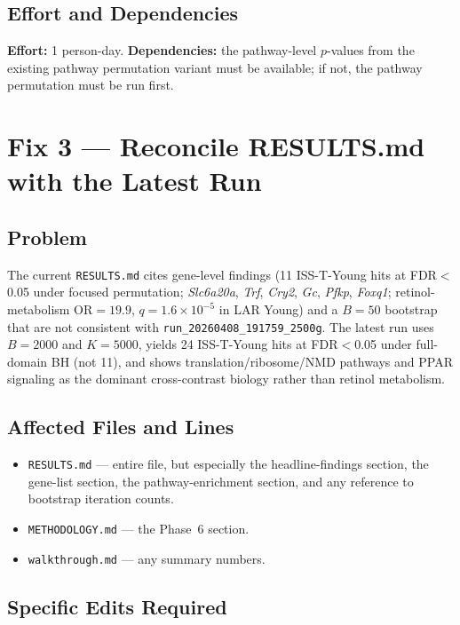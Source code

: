 \documentclass[11pt]{article}
\newcommand{\code}[1]{\texttt{#1}}
\begin{document}
\subsection{Effort and Dependencies}

\textbf{Effort:} 1 person-day. \textbf{Dependencies:} the pathway-level $p$-values from the existing pathway permutation variant must be available; if not, the pathway permutation must be run first.

\section{Fix 3 --- Reconcile RESULTS.md with the Latest Run}

\subsection{Problem}

The current \code{RESULTS.md} cites gene-level findings (11 ISS-T-Young hits at FDR$<$0.05 under focused permutation; \emph{Slc6a20a}, \emph{Trf}, \emph{Cry2}, \emph{Gc}, \emph{Pfkp}, \emph{Foxq1}; retinol-metabolism OR$=19.9$, $q=1.6\times 10^{-5}$ in LAR Young) and a $B{=}50$ bootstrap that are not consistent with \code{run\_20260408\_191759\_2500g}. The latest run uses $B{=}2000$ and $K{=}5000$, yields 24 ISS-T-Young hits at FDR$<$0.05 under full-domain BH (not 11), and shows translation/ribosome/NMD pathways and PPAR signaling as the dominant cross-contrast biology rather than retinol metabolism.

\subsection{Affected Files and Lines}

\begin{itemize}[leftmargin=*]
\item \code{RESULTS.md} --- entire file, but especially the headline-findings section, the gene-list section, the pathway-enrichment section, and any reference to bootstrap iteration counts.
\item \code{METHODOLOGY.md} --- the Phase~6 section.
\item \code{walkthrough.md} --- any summary numbers.
\end{itemize}

\subsection{Specific Edits Required}
\end{document}
